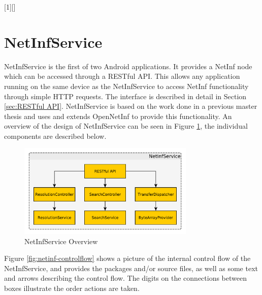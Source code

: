 
[1][]%
	{\minipage{\linewidth} 
		}
	{\endminipage}

\section{NetInfService}
\label{sec:NetInfService}

NetInfService is the first of two Android applications. It provides a NetInf node which can be accessed through a RESTful API. This allows any application running on the same device as the NetInfService to access NetInf functionality through simple HTTP requests. The interface is described in detail in Section \ref{sec:RESTful API}. NetInfService is based on the work done in a previous master thesis \cite{masterthesis} and uses and extends OpenNetInf to provide this functionality. An overview of the design of NetInfService can be seen in Figure \ref{fig:netinfserviceoverview}, the individual components are described below. 

\begin{figure}
	\centering
		\includegraphics[width=0.75\textwidth]{./img/netinfservice}
    	\caption{NetInfService Overview}
	\label{fig:netinfserviceoverview}
\end{figure}

Figure \ref{fig:netinf-controlflow} shows a picture of the internal control flow of the NetInfService,
and provides the packages and/or source files, as well as some text and arrows describing the control flow.
The digits on the connections between boxes illustrate the order actions are taken.



